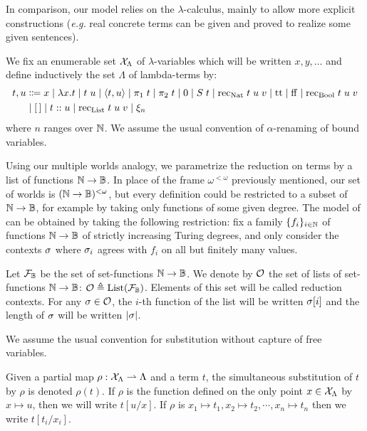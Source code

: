 \documentclass[a4paper,UKenglish,cleveref, autoref, thm-restate]{lipics-v2021}
\begin{document}
In comparison, our model relies on the $\lambda$-calculus, mainly to allow more explicit constructions (\textit{e.g.} real concrete terms can be given and proved to realize some given sentences).



\begin{definition}
  We fix an enumerable set $\mathcal{X}_\Lambda$ of $\lambda$-variables which will be written
  $x,y,\ldots$ and define inductively the set $\Lambda$ of lambda-terms by:
  \begin{align*}
    t,u  &\Coloneq  x \mid \lambda x.t \mid t\;u
     \mid \langle t,u\rangle \mid \pi_1\;t \mid \pi_2\;t
    \mid \lamZ \mid \lamS\;t \mid \rec_{\Nat}\;t\;u\;v
     \mid \rtt \mid \rff \mid \rec_{\Bool}\;t\;u\;v\\
    & \mid \nil \mid t\append u \mid \rec_{\List}\;t\;u\;v
     \mid \oracle_n
  \end{align*}
  where $n$ ranges over $\mathbb N$. We assume the usual convention of $\alpha$-renaming of bound variables.
\end{definition}



Using our multiple worlds analogy, we parametrize the reduction on terms by a list of functions $\mathbb N \to \mathbb B$. In place of the frame $\omega^{<\omega}$ previously mentioned, our set of worlds is $(\mathbb N \to \mathbb B)^{<\omega}$, but every definition could be restricted to a subset of $\mathbb N \to \mathbb B$, for example by taking only functions of some given degree. The model of \cite{LubRat13}
can be obtained by taking the following restriction: fix a family $\{f_i\}_{i \in \mathbb N}$ of functions $\mathbb N \to \mathbb B$ of strictly increasing Turing degrees, and only consider the contexts $\sigma$ where $\sigma_i$ agrees with $f_i$ on all but finitely many values.


\begin{definition}
  Let $\mathcal F_{\mathbb B}$ be the set of set-functions $\mathbb N \to \mathbb B$. We denote by $\mathcal O$ the set of lists of set-functions $\mathbb N \to \mathbb B$:
  $\mathcal O \triangleq \mathrm{List}(\mathcal F_{\mathbb B})$.
  Elements of this set will be called reduction contexts. For any $\sigma \in \mathcal O$, the $i$-th function of the list will be written $\sigma[i]$ and the length of $\sigma$ will be written $|\sigma|$.
\end{definition}

We assume the usual convention for substitution without capture of free variables.

\begin{notation}
  Given a partial map $\rho : \mathcal{X}_\Lambda \rightharpoonup \Lambda$ and a term $t$, the simultaneous substitution of $t$ by $\rho$ is denoted $\rho(t)$. If $\rho$ is the function defined on the only point $x \in \mathcal{X}_\Lambda$ by $x \mapsto u$, then we will write $t[u/x]$. If $\rho$ is $x_1 \mapsto t_1, x_2 \mapsto t_2, \cdots, x_n \mapsto t_n$ then we write $t[t_i/x_i]$.
\end{notation}
\end{document}
